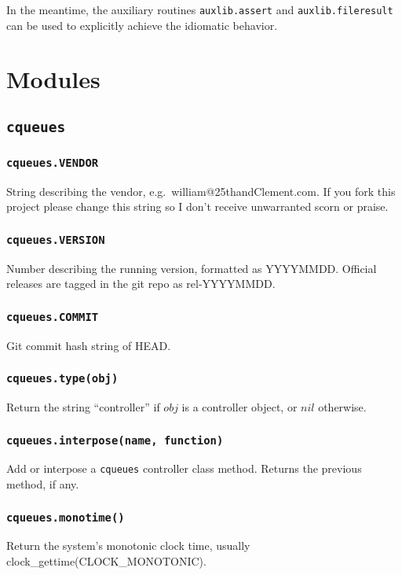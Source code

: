 \documentclass[11pt, oneside]{memoir}
\newcommand*{\cqueues}[0]{\texttt{cqueues}\xspace}
\newcommand*{\routine}[1]{\texttt{#1}\xspace}
\newcommand*{\fn}[1]{\texttt{#1}\xspace}
\newcounter{toccols}
\newenvironment{Module}[1]{
	\subsection{\texttt{#1}}
	\addtocontents{toc}{
		\protect\begin{multicols}{\value{toccols}}
	}
}{
	\addtocontents{toc}{\protect\end{multicols}}
}
\begin{document}
In the meantime, the auxiliary routines \fn{auxlib.assert} and \fn{auxlib.fileresult} can be used to explicitly achieve the idiomatic behavior.

\section{Modules}

\begin{Module}{\cqueues}

\subsubsection{\routine{cqueues.VENDOR}}
String describing the vendor, e.g.\ william@25thandClement.com. If you fork this project please change this string so I don't receive unwarranted scorn or praise.

\subsubsection{\routine{cqueues.VERSION}}
Number describing the running version, formatted as YYYYMMDD. Official releases are tagged in the git repo as rel-YYYYMMDD.

\subsubsection{\routine{cqueues.COMMIT}}
Git commit hash string of HEAD.

\subsubsection[\routine{cqueues.type}]{\routine{cqueues.type(obj)}}
Return the string ``controller'' if $obj$ is a controller object, or $nil$ otherwise.

\subsubsection[\routine{cqueues.interpose}]{\routine{cqueues.interpose(name, function)}}
Add or interpose a \cqueues controller class method. Returns the previous method, if any.

\subsubsection[\routine{cqueues.monotime}]{\routine{cqueues.monotime()}}
Return the system's monotonic clock time, usually clock\_gettime(CLOCK\_MONOTONIC).


\end{Module}
\end{document}
